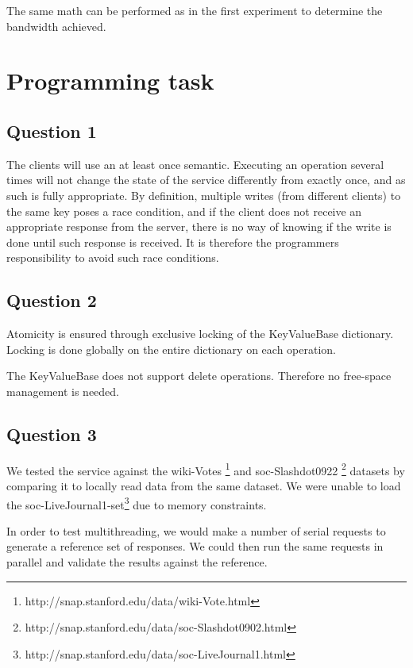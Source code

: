 \documentclass[11pt,a4paper]{article}
\begin{document}
The same math can be performed as in the first experiment to determine the
bandwidth achieved.

\section{Programming task}

\subsection{Question 1}
The clients will use an at least once semantic. Executing an operation
several times will not change the state of the service differently from
exactly once, and as such is fully appropriate.
By definition, multiple writes (from different clients) to the same key poses a race condition,
and if the client does not receive an appropriate response from the server,
there is no way of knowing if the write is done until such response is received.
It is therefore the programmers responsibility to avoid such race conditions.

\subsection{Question 2}
Atomicity is ensured through exclusive locking of the KeyValueBase dictionary.
Locking is done globally on the entire dictionary on each operation.



The KeyValueBase does not support delete operations. Therefore no
free-space management is needed.

\subsection{Question 3}
We tested the service against the wiki-Votes \footnote{http://snap.stanford.edu/data/wiki-Vote.html} and
soc-Slashdot0922 \footnote{http://snap.stanford.edu/data/soc-Slashdot0902.html} datasets
by comparing it to locally read data from the same dataset. We were unable to load the
soc-LiveJournal1-set\footnote{http://snap.stanford.edu/data/soc-LiveJournal1.html} due to
memory constraints.

In order to test multithreading, we would make a number of serial requests to
generate a reference set of responses. We could then run the same requests in
parallel and validate the results against the reference.
\end{document}
